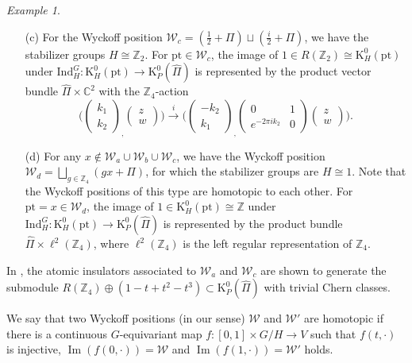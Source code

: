 \documentclass[11pt]{amsart}
\theoremstyle{definition}
\theoremstyle{plain}
\theoremstyle{remark}
\newtheorem{exmp}[equation]{Example}
\newcommand{\bC}{\mathbb{C}}
\newcommand{\bZ}{\mathbb{Z}}
\newcommand{\cW}{\mathcal{W}}
\begin{document}
\begin{exmp}
\begin{itemize}
\item[(c)]
For the Wyckoff position $\mathcal{W}_c = (\frac{1}{2} + \Pi) \sqcup (\frac{i}{2} + \Pi)$, we have the stabilizer groups $H \cong \bZ_2$. For $\mathrm{pt} \in \mathcal{W}_c$, the image of $1 \in R(\bZ_2) \cong \mathrm{K}^0_H(\mathrm{pt})$ under $\mathrm{Ind}^G_H \colon \mathrm{K}^0_{H}(\mathrm{pt}) \to \mathrm{K}^0_P(\hat{\Pi})$ is represented by the product vector bundle $\hat{\Pi} \times \bC^2$ with the $\bZ_4$-action
\[
\Big(
\begin{pmatrix}
k_1 \\ k_2
\end{pmatrix}
_{\textstyle ,} 
\begin{pmatrix} z \\ w \end{pmatrix} \Big)
\overset{i}{\to}
\Big(
\begin{pmatrix}
-k_2 \\ k_1
\end{pmatrix}
_{\textstyle ,}
\begin{pmatrix}
0 & 1 \\
e^{-2\pi i k_2} & 0
\end{pmatrix}
\begin{pmatrix} z \\ w \end{pmatrix} 
\Big).
\]


\item[(d)]
For any $x \not\in \mathcal{W}_a \cup \mathcal{W}_b \cup \mathcal{W}_c$, we have the Wyckoff position $\mathcal{W}_d = \bigsqcup_{g \in \bZ_4}(g x + \Pi)$, for which the stabilizer groups are $H \cong 1$. Note that the Wyckoff positions of this type are homotopic to each other. For $\mathrm{pt} = x \in \mathcal{W}_d$, the image of $1 \in \mathrm{K}^0_H(\mathrm{pt}) \cong \bZ$ under $\mathrm{Ind}^G_H \colon \mathrm{K}^0_{H}(\mathrm{pt}) \to \mathrm{K}^0_P(\hat{\Pi})$ is represented by the product bundle $\hat{\Pi} \times \ell^2(\bZ_4)$, where $\ell^2(\bZ_4)$ is the left regular representation of $\bZ_4$. 
\end{itemize}

In \cite{shiozakiAtiyahHirzebruchSpectral2018}, the atomic insulators associated to $\mathcal{W}_a$ and $\mathcal{W}_c$ are shown to generate the submodule $R(\bZ_4) \oplus (1 - t + t^2 - t^3) \subset \mathrm{K}^0_P(\hat{\Pi})$ with trivial Chern classes. 
\end{exmp}


We say that two Wyckoff positions (in our sense) $\cW$ and $\cW'$ are homotopic if there is a continuous $G$-equivariant map $f \colon [0,1] \times G/H \to V$ such that $f(t,\cdot)$ is injective, $ \mathop{\mathrm{Im}} (f(0, \cdot ))=\cW$ and $\mathop{\mathrm{Im}} (f(1, \cdot ))=\cW'$ holds. 
\end{document}
